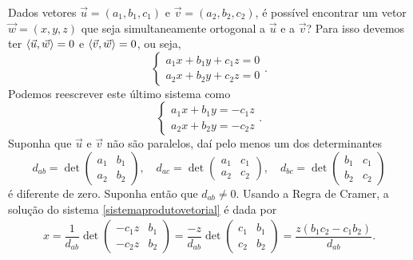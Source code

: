 Dados vetores $\vec{u} = (a_1,b_1,c_1)$ e $\vec{v} = (a_2,b_2,c_2)$, é possível encontrar um vetor $\vec{w} = (x,y,z)$ que seja simultaneamente ortogonal a $\vec{u}$ e a $\vec{v}$? Para isso devemos ter $\langle \vec{u}, \vec{w} \rangle = 0$ e $\langle \vec{v}, \vec{w} \rangle = 0$, ou seja,
\[
    \begin{cases}
        a_1x + b_1y + c_1z = 0 \\
        a_2x + b_2y + c_2z = 0
    \end{cases}.
\]
Podemos reescrever este último sistema como
\begin{equation}\label{sistemaprodutovetorial}
    \begin{cases}
        a_1x + b_1y = -c_1z \\
        a_2x + b_2y = -c_2z
    \end{cases}.
\end{equation}
Suponha que $\vec{u}$ e $\vec{v}$ não são paralelos, daí pelo menos um dos determinantes
\[
    d_{ab} = \det \begin{pmatrix}
        a_1 & b_1 \\
        a_2 & b_2
    \end{pmatrix}, \quad d_{ac} = \det \begin{pmatrix}
        a_1 & c_1 \\
        a_2 & c_2
    \end{pmatrix},\quad d_{bc} = \det \begin{pmatrix}
        b_1 & c_1 \\
        b_2 & c_2
    \end{pmatrix}
\]
é diferente de zero. Suponha então que $d_{ab} \ne 0$. Usando a Regra de Cramer, a solução do sistema \eqref{sistemaprodutovetorial} é dada por
\begin{align*}
    x = \dfrac{1}{d_{ab}}\det \begin{pmatrix}
                                  -c_1z & b_1 \\
                                  -c_2z & b_2
                              \end{pmatrix} = \dfrac{-z}{d_{ab}}\det \begin{pmatrix}
                                                                         c_1 & b_1 \\
                                                                         c_2 & b_2
                                                                     \end{pmatrix} = \dfrac{z(b_1c_2 - c_1b_2)}{d_{ab}}.
\end{align*}
